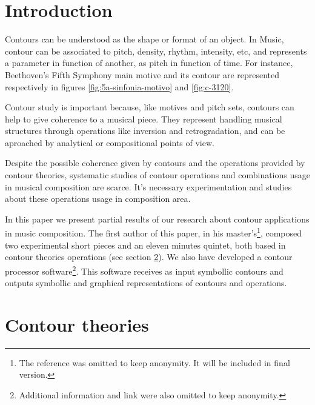 

\section{Introduction}
\label{sec:introduction}

Contours can be understood as the shape or format of an object. In
Music, contour can be associated to pitch, density, rhythm, intensity,
etc, and represents a parameter in function of another, as pitch in
function of time. For instance, Beethoven's Fifth Symphony main motive
and its contour are represented respectively in figures
\ref{fig:5a-sinfonia-motivo} and \ref{fig:c-3120}.

Contour study is important because, like motives and pitch sets,
contours can help to give coherence to a musical piece. They represent
handling musical structures through operations like inversion and
retrogradation, and can be aproached by analytical or compositional
points of view.

Despite the possible coherence given by contours and the operations
provided by contour theories, systematic studies of contour operations
and combinations usage in musical composition are scarce. It's
necessary experimentation and studies about these operations usage in
composition area.

In this paper we present partial results of our research about contour
applications in music composition. The first author of this paper, in
his master's\footnote{The reference was omitted to keep anonymity. It
  will be included in final version.}, composed two experimental short
pieces and an eleven minutes quintet, both based in contour theories
operations (see section \ref{sec:contour-theories}). We also have
developed a contour processor software\footnote{Additional information
  and link were also omitted to keep anonymity.}. This software
receives as input symbollic contours and outputs symbollic and
graphical representations of contours and operations.

\section{Contour theories}
\label{sec:contour-theories}

